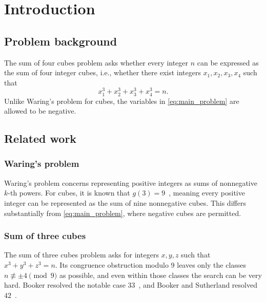 \documentclass{mcom-l}
\theoremstyle{definition}
\theoremstyle{remark}
\numberwithin{equation}{section}
\begin{document}
\maketitle

\section{Introduction}
\label{sec:introduction}

\subsection{Problem background}
\label{subsec:problem_background}

The sum of four cubes problem asks whether every integer $n$ can be
expressed as the sum of four integer cubes, i.e., whether there exist
integers $x_1,x_2,x_3,x_4$ such that
\begin{equation}
x_1^3 + x_2^3 + x_3^3 + x_4^3 = n.
\label{eq:main_problem}
\end{equation}
Unlike Waring's problem for cubes, the variables in
\eqref{eq:main_problem} are allowed to be negative.

\subsection{Related work}
\label{subsec:related_work}

\subsubsection{Waring's problem}
Waring's problem concerns representing positive integers as sums of
nonnegative $k$-th powers.  For cubes, it is known that
$g(3)=9$~\cite{HardyWright2008}, meaning every positive integer can be
represented as the sum of nine nonnegative cubes.  This differs
substantially from \eqref{eq:main_problem}, where negative cubes are
permitted.

\subsubsection{Sum of three cubes}
The sum of three cubes problem asks for integers $x,y,z$ such that
$x^3+y^3+z^3=n$.  Its congruence obstruction modulo $9$ leaves only the
classes $n\not\equiv \pm 4\pmod 9$ as possible, and even within those
classes the search can be very hard.  Booker resolved the notable case
$33$~\cite{Booker2019}, and Booker and Sutherland resolved
$42$~\cite{BookerSutherland2021}.
\end{document}
